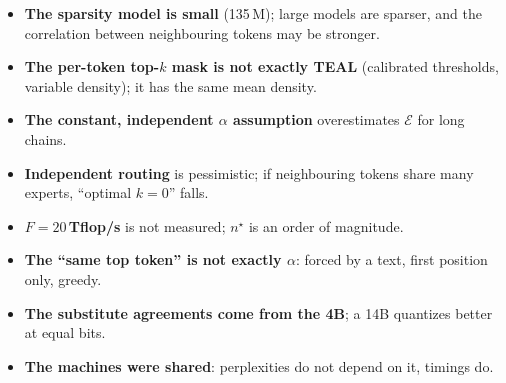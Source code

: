 \begin{faux}
\begin{itemize}
\item \textbf{The sparsity model is small} (135\,M); large models are sparser, and the correlation between neighbouring tokens may be stronger.
\item \textbf{The per-token top-$k$ mask is not exactly TEAL} (calibrated thresholds, variable density); it has the same mean density.
\item \textbf{The constant, independent $\alpha$ assumption} overestimates $\mathcal E$ for long chains.
\item \textbf{Independent routing} is pessimistic; if neighbouring tokens share many experts, \enquote{optimal $k = 0$} falls.
\item \textbf{$F = 20$\,Tflop/s} is not measured; $n^\star$ is an order of magnitude.
\item \textbf{The \enquote{same top token} is not exactly $\alpha$}: forced by a text, first position only, greedy.
\item \textbf{The substitute agreements come from the 4B}; a 14B quantizes better at equal bits.
\item \textbf{The machines were shared}: perplexities do not depend on it, timings do.
\end{itemize}
\end{faux}

